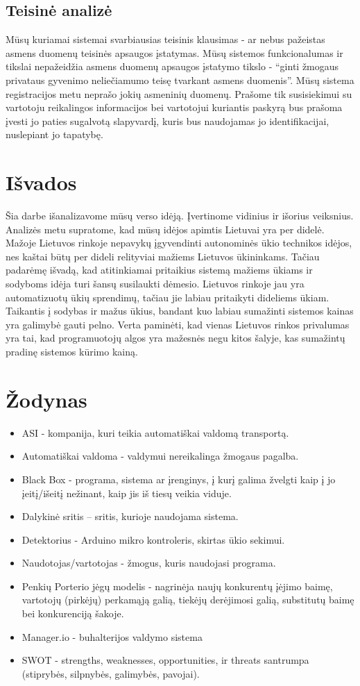 \documentclass[oneside]{VUMIFPSkursinis}
\begin{document}
	\subsection{Teisinė analizė}
Mūsų kuriamai sistemai svarbiausias teisinis klausimas - ar nebus pažeistas asmens duomenų teisinės apsaugos įstatymas. Mūsų sistemos funkcionalumas ir tikslai nepažeidžia asmens duomenų apsaugos įstatymo tikslo - “ginti žmogaus privataus gyvenimo neliečiamumo teisę tvarkant asmens duomenis”. Mūsų sistema registracijos metu neprašo jokių asmeninių duomenų. Prašome tik susisiekimui su vartotoju reikalingos informacijos bei vartotojui kuriantis paskyrą bus prašoma įvesti jo paties sugalvotą slapyvardį, kuris bus naudojamas jo identifikacijai, nuslepiant jo tapatybę.
\section{Išvados}
	Šia darbe išanalizavome mūsų verso idėją. Įvertinome vidinius ir išorius veiksnius. Analizės metu supratome, kad mūsų idėjos apimtis Lietuvai yra per didelė. Mažoje Lietuvos rinkoje nepavykų įgyvendinti autonominės ūkio technikos idėjos, nes kaštai būtų per dideli relityviai mažiems Lietuvos ūkininkams. Tačiau padarėmę išvadą, kad atitinkiamai pritaikius sistemą mažiems ūkiams ir sodyboms idėja turi šansų susilaukti dėmesio. Lietuvos rinkoje jau yra automatizuotų ūkių sprendimų, tačiau jie labiau pritaikyti dideliems ūkiam. Taikantis į sodybas ir mažus ūkius, bandant kuo labiau sumažinti sistemos kainas yra galimybė gauti pelno. Verta paminėti, kad vienas Lietuvos rinkos privalumas yra tai, kad programuotojų algos yra mažesnės negu kitos šalyje, kas sumažintų pradinę sistemos kūrimo kainą.
	
 
\section{Žodynas}
\begin{itemize}
\item ASI - kompanija, kuri teikia automatiškai valdomą transportą.
\item Automatiškai valdoma - valdymui nereikalinga žmogaus pagalba.
\item Black Box - programa, sistema ar įrenginys, į kurį galima žvelgti kaip į jo įeitį/išeitį nežinant, kaip jis iš tiesų veikia viduje.
\item Dalykinė sritis – sritis, kurioje naudojama sistema.
\item Detektorius - Arduino mikro kontroleris, skirtas ūkio sekimui.
\item Naudotojas/vartotojas - žmogus, kuris naudojasi programa.
\item Penkių Porterio jėgų modelis - nagrinėja naujų konkurentų įėjimo baimę, vartotojų (pirkėjų) perkamąją galią, tiekėjų derėjimosi galią, substitutų baimę bei konkurenciją šakoje.
\item Manager.io - buhalterijos valdymo sistema
\item SWOT - strengths, weaknesses, opportunities, ir threats santrumpa (stiprybės, silpnybės, galimybės, pavojai).
\end{itemize}
\end{document}
